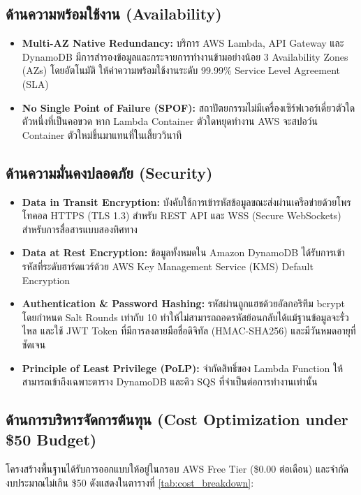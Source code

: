 \documentclass[12pt,a4paper]{report}
\begin{document}
\subsection{ด้านความพร้อมใช้งาน (Availability)}
\begin{itemize}
    \item \textbf{Multi-AZ Native Redundancy:} บริการ AWS Lambda, API Gateway และ DynamoDB มีการสำรองข้อมูลและกระจายการทำงานข้ามอย่างน้อย 3 Availability Zones (AZs) โดยอัตโนมัติ ให้ค่าความพร้อมใช้งานระดับ 99.99\% Service Level Agreement (SLA)
    \item \textbf{No Single Point of Failure (SPOF):} สถาปัตยกรรมไม่มีเครื่องเซิร์ฟเวอร์เดี่ยวตัวใดตัวหนึ่งที่เป็นคอขวด หาก Lambda Container ตัวใดหยุดทำงาน AWS จะสปอว์น Container ตัวใหม่ขึ้นมาแทนที่ในเสี้ยววินาที
\end{itemize}

\subsection{ด้านความมั่นคงปลอดภัย (Security)}
\begin{itemize}
    \item \textbf{Data in Transit Encryption:} บังคับใช้การเข้ารหัสข้อมูลขณะส่งผ่านเครือข่ายด้วยโพรโทคอล HTTPS (TLS 1.3) สำหรับ REST API และ WSS (Secure WebSockets) สำหรับการสื่อสารแบบสองทิศทาง
    \item \textbf{Data at Rest Encryption:} ข้อมูลทั้งหมดใน Amazon DynamoDB ได้รับการเข้ารหัสที่ระดับฮาร์ดแวร์ด้วย AWS Key Management Service (KMS) Default Encryption
    \item \textbf{Authentication \& Password Hashing:} รหัสผ่านถูกแฮชด้วยอัลกอริทึม bcrypt โดยกำหนด Salt Rounds เท่ากับ 10 ทำให้ไม่สามารถถอดรหัสย้อนกลับได้แม้ฐานข้อมูลจะรั่วไหล และใช้ JWT Token ที่มีการลงลายมือชื่อดิจิทัล (HMAC-SHA256) และมีวันหมดอายุที่ชัดเจน
    \item \textbf{Principle of Least Privilege (PoLP):} จำกัดสิทธิ์ของ Lambda Function ให้สามารถเข้าถึงเฉพาะตาราง DynamoDB และคิว SQS ที่จำเป็นต่อการทำงานเท่านั้น
\end{itemize}

\subsection{ด้านการบริหารจัดการต้นทุน (Cost Optimization under \$50 Budget)}
โครงสร้างพื้นฐานได้รับการออกแบบให้อยู่ในกรอบ AWS Free Tier (\$0.00 ต่อเดือน) และจำกัดงบประมาณไม่เกิน \$50 ดังแสดงในตารางที่ \ref{tab:cost_breakdown}:
\end{document}
